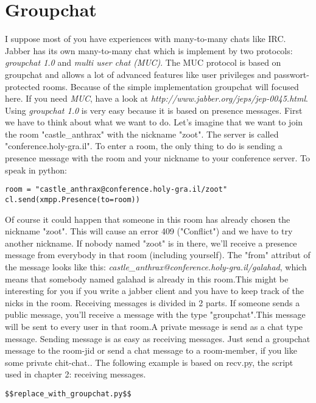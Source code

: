 \section{Groupchat}

I suppose most of you have experiences with many-to-many chats like IRC. Jabber has its own many-to-many chat which is implement by two protocols: \textit{groupchat 1.0} and \textit{multi user chat (MUC)}.
The MUC protocol is based on groupchat and allows a lot of advanced features like user privileges and passwort-protected rooms.
Because of the simple implementation groupchat will focused here.
If you need \textit{MUC}, have a look at \textit{http://www.jabber.org/jeps/jep-0045.html}.
\newline
\newline
Using \textit{groupchat 1.0} is very easy because it is based on presence messages.
First we have to think about what we want to do. Let's imagine that we want to join the room "castle\_anthrax" with the nickname "zoot". The server is called "conference.holy-gra.il".
To enter a room, the only thing to do is sending a presence message with the room and your nickname to your conference server.
\newline
To speak in python:
\begin{verbatim}
room = "castle_anthrax@conference.holy-gra.il/zoot"
cl.send(xmpp.Presence(to=room))
\end{verbatim}
Of course it could happen that someone in this room has already chosen the nickname "zoot". This will cause an error 409 ("Conflict") and we have to try another nickname.
\newline
If nobody named "zoot" is in there, we'll receive a presence message from everybody in that room (including yourself).
The "from" attribut of the message looks like this: \textit{castle\_anthrax@conference.holy-gra.il/galahad}, which means that somebody named galahad is already in this room.This might be interesting for you if you write a jabber client and you have to keep track of the nicks in the room.
\newline
Receiving messages is divided in 2 parts. If someone sends a public message, you'll receive a message with the type "groupchat".This message will be sent to every user in that room.A private message is send as a chat type message.
\newline
Sending message is as easy as receiving messages. Just send a groupchat message to the room-jid or send a chat message to a room-member, if you like some private chit-chat..
\newline
\newline
The following example is based on recv.py, the script used in chapter 2: receiving messages.


\begin{verbatim}
$$replace_with_groupchat.py$$
\end{verbatim}
